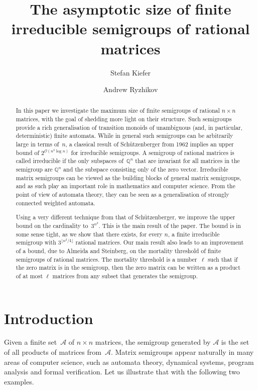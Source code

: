 \documentclass{lmcs}
\title[The asymptotic size of finite irreducible semigroups of rational matrices]{The asymptotic size of finite irreducible semigroups of rational matrices}
\author[S.\ Kiefer]{Stefan Kiefer\lmcsorcid{0000-0003-4173-6877}}[a]
\author[A.\ Ryzhikov]{Andrew Ryzhikov\lmcsorcid{0000-0002-2031-2488}}[b]
\theoremstyle{definition}
\newcommand{\OO}{\mathcal{O}}
\newcommand{\Aa}{\mathcal{A}}
\newcommand{\Q}{\mathbb{Q}}
\begin{document}
\begin{abstract}
In this paper we investigate the maximum size of finite semigroups of rational $n \times n$ matrices, with the goal of shedding more light on their structure. 
Such semigroups provide a rich generalisation of transition monoids of unambiguous (and, in particular, deterministic) finite automata.
While in general such semigroups can be arbitrarily large in terms of~$n$, a classical result of Sch{\"{u}}tzenberger from 1962 implies an upper bound of $2^{\OO(n^2 \log n)}$ for irreducible semigroups. A semigroup of rational matrices is called irreducible if the only subspaces of~$\Q^n$ that are invariant for all matrices in the semigroup are $\Q^n$ and the subspace consisting only of the zero vector.
Irreducible matrix semigroups can be viewed as the building blocks of general matrix semigroups, and as such play an important role in mathematics and computer science. From the point of view of automata theory, they can be seen as a generalisation of strongly connected weighted automata.
 
Using a very different technique from that of Sch{\"{u}}tzenberger, we improve the upper bound on the cardinality to~$3^{n^2}$.
This is the main result of the paper.
The bound is in some sense tight, as we show that there exists, for every $n$, a finite irreducible semigroup with $3^{\lfloor n^2/4 \rfloor}$ rational matrices.
Our main result also leads to an improvement of a bound, due to Almeida and Steinberg, on the mortality threshold of finite semigroups of rational matrices.
The mortality threshold is a number~$\ell$ such that if the zero matrix is in the semigroup, then the zero matrix can be written as a product of at most $\ell$ matrices from any subset that generates the semigroup.
\end{abstract}

\maketitle

\section{Introduction}\label{sec:intro-new}
Given a finite set~$\Aa$ of $n \times n$ matrices, the semigroup generated by $\Aa$ is the set of all products of matrices from~$\Aa$. Matrix semigroups appear naturally in many areas of computer science, such as automata theory, dynamical systems, program analysis and formal verification. Let us illustrate that with the following two examples.
\end{document}
